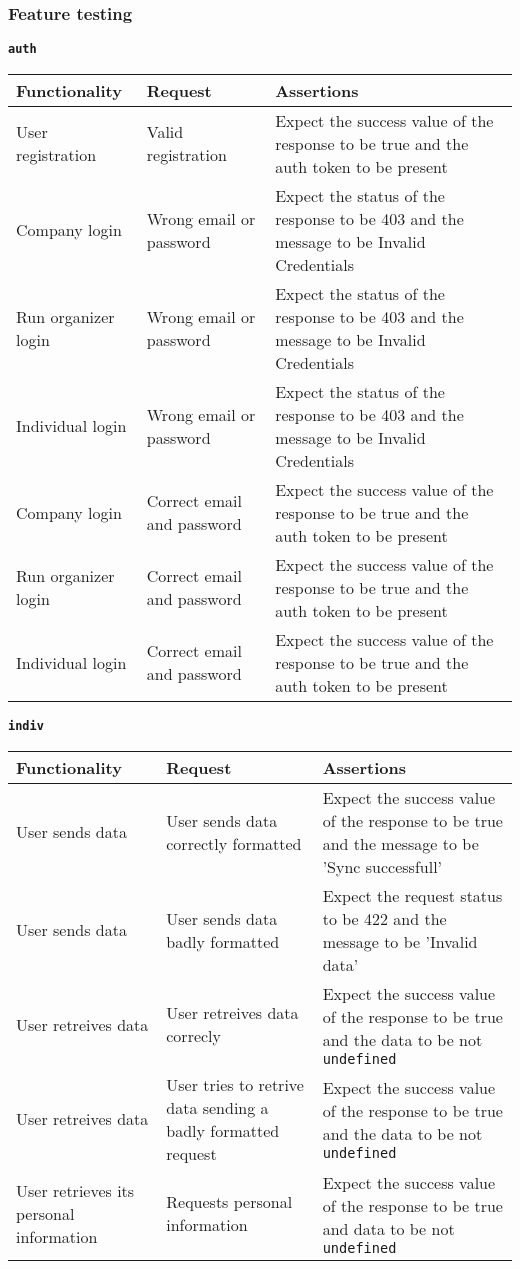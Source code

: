 \subsubsection{Feature testing}
\noindent\textbf{\texttt{auth}}
\begin{longtable}{|p{}|p{}|p{}|}
\hline
\textbf{Functionality} & \textbf{Request} & \textbf{Assertions} \\
\hline
User registration & Valid registration & Expect the success value of the response to be true and the auth token to be present\\
\hline
Company login & Wrong email or password & Expect the status of the response to be 403 and the message to be Invalid Credentials \\
\hline
Run organizer login & Wrong email or password & Expect the status of the response to be 403 and the message to be Invalid Credentials \\
\hline
Individual login & Wrong email or password & Expect the status of the response to be 403 and the message to be Invalid Credentials \\
\hline
Company login & Correct email and password &Expect the success value of the response to be true and the auth token to be present \\
\hline
Run organizer login & Correct email and password &Expect the success value of the response to be true and the auth token to be present \\
\hline
Individual login & Correct email and password & Expect the success value of the response to be true and the auth token to be present \\

\end{longtable}

\noindent\textbf{\texttt{indiv}}
\begin{longtable}{|p{}|p{}|p{}|}
\hline
\textbf{Functionality} & \textbf{Request} & \textbf{Assertions} \\
\hline
User sends data & User sends data correctly formatted & Expect the success value of the response to be true and the message to be 'Sync successfull'\\
\hline
User sends data & User sends data badly formatted & Expect the request status to be 422 and the message to be 'Invalid data'\\
\hline
User retreives data & User retreives data correcly & Expect the success value of the response to be true and the data to be not \texttt{undefined} \\
\hline
User retreives data & User tries to retrive data sending a badly formatted request & Expect the success value of the response to be true and the data to be not \texttt{undefined} \\
\hline
User retrieves its personal information & Requests personal information & Expect the success value of the response to be true and data to be not \texttt{undefined} \\
\hline

\end{longtable}


